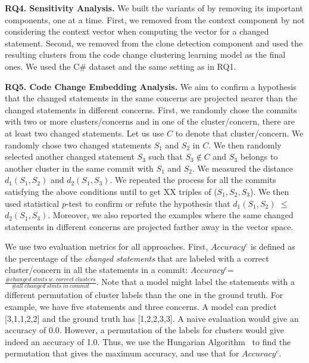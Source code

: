 \noindent\textbf{RQ4. Sensitivity Analysis.}
We built the variants of {\tool} by removing its important components,
one at a time. First, we removed from {\tool} the context component by
not considering the context vector when computing the vector
for a changed statement. Second, we removed from {\tool} the
clone detection component and used the resulting clusters from the
code change clustering learning model as the final ones. We used the
C\# dataset and the same setting as in RQ1.


\noindent\textbf{RQ5. Code Change Embedding Analysis.}
We aim to confirm a hypothesis that the changed statements in the same
concerns are projected nearer than the changed statements in different
concerns. First, we randomly chose the commits with two or more
clusters/concerns and in one of the cluster/concern, there are at
least two changed statements. Let us use $C$ to denote that
cluster/concern. We randomly chose two changed statements $S_1$ and
$S_2$ in $C$. We then randomly selected another changed statement
$S_3$ such that $S_3 \notin C$ and $S_3$ belongs to another cluster in
the same commit with $S_1$ and $S_2$. We measured the distance
$d_1(S_1,S_2)$ and $d_2(S_1,S_3)$. We repeated the process for all the
commits satisfying the above conditions until to get XX triples of
($S_1, S_2, S_3$). We then used statistical $p$-test to confirm or
refute the hypothesis that $d_1(S_1,S_2)$ $\leq$ $d_2(S_1,S_3)$.
Moreover, we also reported the examples where the same changed
statements in different concerns are projected farther away in the
vector space.




 We use two evaluation metrics for
all approaches. First, $Accuracy^{c}$ is defined as the percentage of
the {\em changed statements} that are labeled with a correct
cluster/concern in all the statements in a commit: $Accuracy^{c}$=
$\frac{\# changed\:stmts\:w.\:correct\:clusters}{\#
all\:changed\:stmts\:in\:commit}$.  Note that a model might label the
statements with a different permutation of cluster labels than the one
in the ground truth. For example, we have five statements and three
concerns. A model can predict [3,1,1,2,2] and the ground truth has
[1,2,2,3,3]. A naive evaluation would give an accuracy of
0.0. However, a permutation of the labels for clusters would give
indeed an accuracy of 1.0. Thus, we use the Hungarian
Algorithm~\cite{hungarian-algo} to find the permutation that gives the
maximum accuracy, and use that for $Accuracy^{c}$.

